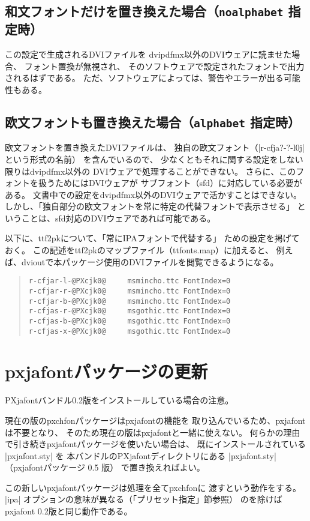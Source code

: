\documentclass[a4paper,uplatex]{jsarticle}
\newcommand{\Pkg}[1]{\textsf{#1}}
\begin{document}
\subsection{和文フォントだけを置き換えた場合（\texttt{noalphabet} 指定時）}

この設定で生成されるDVIファイルを
dvipdfmx以外のDVIウェアに読ませた場合、
フォント置換が無視され、
そのソフトウェアで設定されたフォントで出力されるはずである。
ただ、ソフトウェアによっては、警告やエラーが出る可能性もある。

\subsection{欧文フォントも置き換えた場合（\texttt{alphabet} 指定時）}

欧文フォントを置き換えたDVIファイルは、
独自の欧文フォント（|r-cfja?-?-l0j| という形式の名前）
を含んでいるので、
少なくともそれに関する設定をしない限りはdvipdfmx以外の
DVIウェアで処理することができない。
さらに、このフォントを扱うためにはDVIウェアが
サブフォント（sfd）に対応している必要がある。
文書中での設定をdvipdfmx以外のDVIウェアで活かすことはできない。
しかし、「独自部分の欧文フォントを常に特定の代替フォントで表示させる」
ということは、sfd対応のDVIウェアであれば可能である。

以下に、ttf2pkについて、「常にIPAフォントで代替する」
ための設定を掲げておく。
この記述をttf2pkのマップファイル（ttfonts.map）に加えると、
例えば、dvioutで本パッケージ使用のDVIファイルを閲覧できるようになる。

\begin{quote}\small\begin{verbatim}
r-cfjar-l-@PXcjk0@     msmincho.ttc FontIndex=0
r-cfjar-r-@PXcjk0@     msmincho.ttc FontIndex=0
r-cfjar-b-@PXcjk0@     msmincho.ttc FontIndex=0
r-cfjas-r-@PXcjk0@     msgothic.ttc FontIndex=0
r-cfjas-b-@PXcjk0@     msgothic.ttc FontIndex=0
r-cfjas-x-@PXcjk0@     msgothic.ttc FontIndex=0
\end{verbatim}\end{quote}

\section{pxjafontパッケージの更新}

{\sffamily
\Pkg{PXjafont}バンドル0.2版をインストールしている場合の注意。}

現在の版の\Pkg{pxchfon}パッケージは\Pkg{pxjafont}の機能を
取り込んでいるため、\Pkg{pxjafont}は不要となり、
そのため現在の版は\Pkg{pxjafont}と一緒に使えない。
何らかの理由で引き続き\Pkg{pxjafont}パッケージを使いたい場合は、
既にインストールされている |pxjafont.sty| を
本バンドルの\Pkg{PXjafont}ディレクトリにある %
|pxjafont.sty|（\Pkg{pxjafont}パッケージ 0.5 版）
で置き換えればよい。

この新しい\Pkg{pxjafont}パッケージは処理を全て\Pkg{pxchfon}に
渡すという動作をする。
|ipa| オプションの意味が異なる（「プリセット指定」節参照）
のを除けば\Pkg{pxjafont} 0.2版と同じ動作である。

\end{document}
